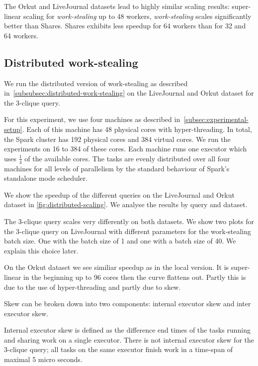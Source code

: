 The Orkut and LiveJournal datasets lead to highly similar scaling results:
super-linear scaling for \textit{work-stealing} up to 48 workers,
\textit{work-stealing} scales significantly better than Shares.
Shares exhibits less speedup for 64 workers than for 32 and 64 workers.




\subsection{Distributed work-stealing}\label{subsec:distributed-work-stealing}


We run the distributed version of work-stealing as described in~\cref{subsubsec:distributed-work-stealing}
on the LiveJournal and Orkut dataset for the 3-clique query.

For this experiment, we use four machines as described in~\cref{subsec:experimental-setup}.
Each of this machine has 48 physical cores with hyper-threading.
In total, the Spark cluster has 192 physical cores and 384 virtual cores.
We run the experiments on 16 to 384 of these cores.
Each machine runs one executor which uses $\frac{1}{4}$ of the available cores.
The tasks are evenly distributed over all four machines for all levels of parallelism by
the standard behaviour of Spark's standalone mode scheduler.

We show the speedup of the different queries on the LiveJournal and Orkut dataset in \cref{fig:distributed-scaling}.
We analyse the results by query and dataset.

The 3-clique query scales very differently on both datasets.
We show two plots for the 3-clique query on LiveJournal with different parameters for the work-stealing
batch size.
One with the batch size of 1 and one with a batch size of 40.
We explain this choice later.

On the Orkut dataset we see similiar speedup as in the local version.
It is super-linear in the beginning up to 96 cores then the curve flattens out.
Partly this is due to the use of hyper-threading and partly due to skew.

Skew can be broken down into two components: internal executor skew and inter executor skew.

Internal executor skew is defined as the difference end times of the tasks running and sharing work on
a single executor.
There is not internal executor skew for the 3-clique query;
all tasks on the same executor finish work in a time-span of maximal 5 micro seconds.

